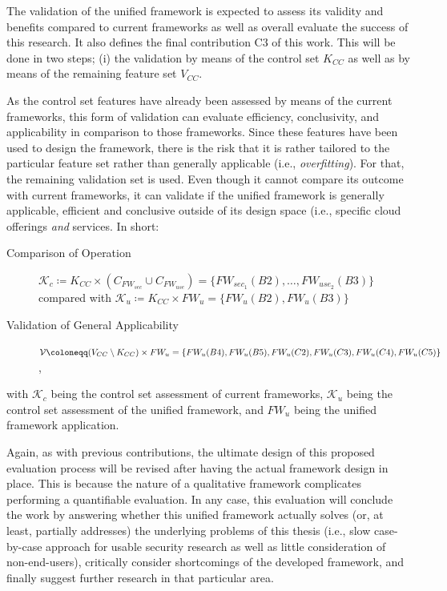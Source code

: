The validation of the unified framework is expected to assess its validity and benefits compared to current frameworks as well as overall evaluate the success of this research. It also defines the final contribution C3 of this work. This will be done in two steps; (i) the validation by means of the control set $K_{CC}$ as well as by means of the remaining feature set $V_{CC}$.

As the control set features have already been assessed by means of the current frameworks, this form of validation can evaluate efficiency, conclusivity, and applicability in comparison to those frameworks. Since these features have been used to design the framework, there is the risk that it is rather tailored to the particular feature set rather than generally applicable (i.e., \textit{overfitting}). For that, the remaining validation set is used. Even though it cannot compare its outcome with current frameworks, it can validate if the unified framework is generally applicable, efficient and conclusive outside of its design space (i.e., specific cloud offerings \textit{and} services. In short:

\begin{description}
	\item[Comparison of Operation] $\mathcal{K}_c \coloneqq K_{CC} \times (C_{FW_{sec}} \cup C_{FW_{use}}) = \{FW_{sec_1}(B2), \dots, FW_{use_2}(B3)\}$ compared with $\mathcal{K}_u \coloneqq K_{CC} \times FW_u = \{FW_u(B2), FW_u(B3)\}$
	\item[Validation of General Applicability] $\mathcal{V} \coloneqq (V_{CC} \setminus K_{CC}) \times FW_u = \{FW_u(B4), FW_u(B5), FW_u(C2),\\ FW_u(C3), FW_u(C4), FW_u(C5)\}$,
\end{description}

with $\mathcal{K}_c$ being the control set assessment of current frameworks, $\mathcal{K}_u$ being the control set assessment of the unified framework, and $FW_u$ being the unified framework application. 

Again, as with previous contributions, the ultimate design of this proposed evaluation process will be revised after having the actual framework design in place. This is because the nature of a qualitative framework complicates performing a quantifiable evaluation. In any case, this evaluation will conclude the work by answering whether this unified framework actually solves (or, at least, partially addresses) the underlying problems of this thesis (i.e., slow case-by-case approach for usable security research as well as little consideration of non-end-users), critically consider shortcomings of the developed framework, and finally suggest further research in that particular area.

